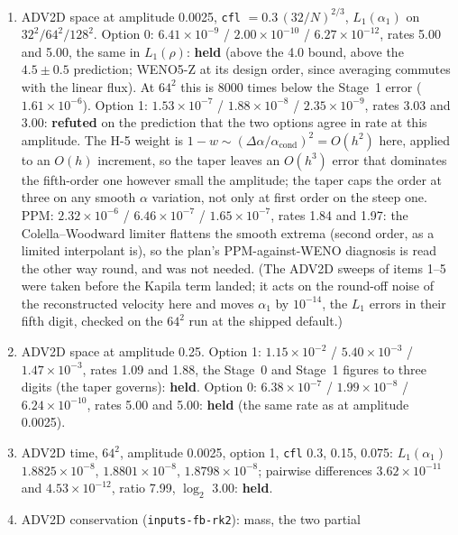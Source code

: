 \documentclass[11pt,a4paper]{article}
\newcommand{\code}[1]{\texttt{\small #1}}
\begin{document}
\begin{enumerate}[nosep]
\item ADV2D space at amplitude 0.0025, \code{cfl} $=0.3\,(32/N)^{2/3}$,
      $L_1(\alpha_1)$ on $32^2/64^2/128^2$.  Option 0:
      $6.41\times10^{-9}$ / $2.00\times10^{-10}$ / $6.27\times10^{-12}$,
      rates 5.00 and 5.00, the same in $L_1(\rho)$: \textbf{held} (above
      the 4.0 bound, above the $4.5\pm0.5$ prediction; WENO5-Z at its
      design order, since averaging commutes with the linear flux).  At
      $64^2$ this is 8000 times below the Stage~1 error
      ($1.61\times10^{-6}$).  Option 1: $1.53\times10^{-7}$ /
      $1.88\times10^{-8}$ / $2.35\times10^{-9}$, rates 3.03 and 3.00:
      \textbf{refuted} on the prediction that the two options agree in
      rate at this amplitude.  The H-5 weight is $1-w\sim(\Delta\alpha/\alpha_{\mathrm{cond}})^2 = O(h^2)$
      here, applied to an $O(h)$ increment, so the taper leaves an
      $O(h^3)$ error that dominates the fifth-order one however small the
      amplitude; the taper caps the order at three on any smooth
      $\alpha$ variation, not only at first order on the steep one.  PPM:
      $2.32\times10^{-6}$ / $6.46\times10^{-7}$ / $1.65\times10^{-7}$, rates
      1.84 and 1.97: the Colella--Woodward limiter flattens the smooth
      extrema (second order, as a limited interpolant is), so the plan's
      PPM-against-WENO diagnosis is read the other way round, and was not
      needed.  (The ADV2D sweeps of items 1--5 were taken before the
      Kapila term landed; it acts on the round-off noise of the
      reconstructed velocity here and moves $\alpha_1$ by $10^{-14}$,
      the $L_1$ errors in their fifth digit, checked on the $64^2$ run
      at the shipped default.)
\item ADV2D space at amplitude 0.25.  Option 1: $1.15\times10^{-2}$ /
      $5.40\times10^{-3}$ / $1.47\times10^{-3}$, rates 1.09 and 1.88, the
      Stage~0 and Stage~1 figures to three digits (the taper governs):
      \textbf{held}.  Option 0: $6.38\times10^{-7}$ / $1.99\times10^{-8}$
      / $6.24\times10^{-10}$, rates 5.00 and 5.00: \textbf{held} (the same
      rate as at amplitude 0.0025).
\item ADV2D time, $64^2$, amplitude 0.0025, option 1, \code{cfl} 0.3,
      0.15, 0.075: $L_1(\alpha_1)$ $1.8825\times10^{-8}$,
      $1.8801\times10^{-8}$, $1.8798\times10^{-8}$; pairwise differences
      $3.62\times10^{-11}$ and $4.53\times10^{-12}$, ratio 7.99, $\log_2$
      3.00: \textbf{held}.
\item ADV2D conservation (\code{inputs-fb-rk2}): mass, the two partial

\end{enumerate}
\end{document}
